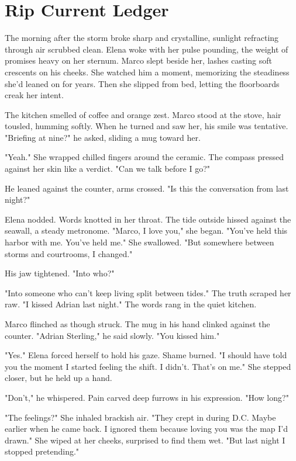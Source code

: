 \chapter{Rip Current Ledger}

The morning after the storm broke sharp and crystalline, sunlight refracting through air scrubbed clean. Elena woke with her pulse pounding, the weight of promises heavy on her sternum. Marco slept beside her, lashes casting soft crescents on his cheeks. She watched him a moment, memorizing the steadiness she'd leaned on for years. Then she slipped from bed, letting the floorboards creak her intent.

The kitchen smelled of coffee and orange zest. Marco stood at the stove, hair tousled, humming softly. When he turned and saw her, his smile was tentative. "Briefing at nine?" he asked, sliding a mug toward her.

"Yeah." She wrapped chilled fingers around the ceramic. The compass pressed against her skin like a verdict. "Can we talk before I go?"

He leaned against the counter, arms crossed. "Is this the conversation from last night?"

Elena nodded. Words knotted in her throat. The tide outside hissed against the seawall, a steady metronome. "Marco, I love you," she began. "You've held this harbor with me. You've held me." She swallowed. "But somewhere between storms and courtrooms, I changed."

His jaw tightened. "Into who?"

"Into someone who can't keep living split between tides." The truth scraped her raw. "I kissed Adrian last night." The words rang in the quiet kitchen.

Marco flinched as though struck. The mug in his hand clinked against the counter. "Adrian Sterling," he said slowly. "You kissed him."

"Yes." Elena forced herself to hold his gaze. Shame burned. "I should have told you the moment I started feeling the shift. I didn't. That's on me." She stepped closer, but he held up a hand.

"Don't," he whispered. Pain carved deep furrows in his expression. "How long?"

"The feelings?" She inhaled brackish air. "They crept in during D.C. Maybe earlier when he came back. I ignored them because loving you was the map I'd drawn." She wiped at her cheeks, surprised to find them wet. "But last night I stopped pretending."

